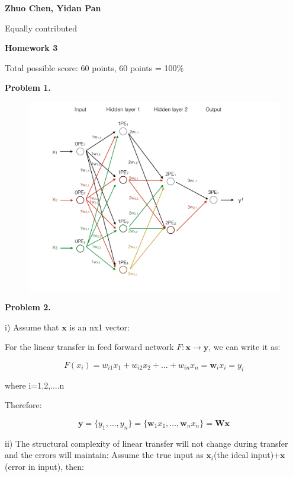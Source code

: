 \documentclass[epsfig]{article}
\def\bpar{\vskip26pt}
\def\npar{\vskip13pt}
\def\spar{\vskip10pt}
\begin{document}
\parindent=0pt

{\bf 
\npar
Zhuo Chen, Yidan Pan

Equally contributed
\bpar
}
\bpar
\centerline{\bf Homework 3}
\npar
\begin{centering}{Total possible score: 60 points, 60 points = 100\%\\}
\end{centering}
\npar




\bpar
{\bf Problem 1.}
\spar
\begin{figure}[htbp] 
\centering\includegraphics[width=7 in]{Hw3fig1.pdf} 
\end{figure} 

\spar

\bpar
{\bf Problem 2.}

i) 
\spar
Assume that ${\textbf{x}}$ is an nx1 vector:

For the linear transfer in feed forward network ${F:\textbf{x} \rightarrow \textbf{y}}$, we can write it as:

$${F(x_i)=w_{i1}x_1+w_{i2}x_2+\dots +w_{in}x_n}= \textbf{w}_ix_i=y_i$$

where i=1,2,....n

Therefore:

$${\textbf{y}=\{y_1,\dots, y_n\} = \{ \textbf{w}_1x_1,\dots,  \textbf{w}_nx_n\} = \textbf{Wx}}$$

 
\spar

ii) \spar
The structural complexity of linear transfer will not change during transfer and the errors will maintain:
Assume the true input as $\textbf{x}_i$(the ideal input)+$\textbf{x}$(error in input), then:
\end{document}
